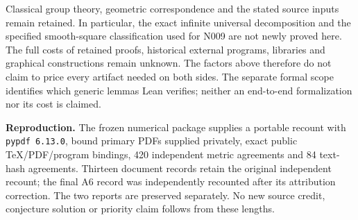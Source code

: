\documentclass[11pt,a4paper]{article}
\begin{document}
Classical group theory, geometric correspondence and the stated source
inputs remain retained. In particular, the exact infinite universal
decomposition and the specified smooth-square classification used for
N009 are not newly proved here. The full costs of retained proofs,
historical external programs, libraries and graphical constructions remain
unknown. The factors above therefore do not claim to price every artifact
needed on both sides. The separate formal scope identifies which generic
lemmas Lean verifies; neither an end-to-end formalization nor its cost is
claimed.

\medskip\noindent\textbf{Reproduction.}
The frozen numerical package supplies a portable recount with
\texttt{pypdf 6.13.0}, bound primary PDFs supplied privately, exact public
TeX/PDF/program bindings, 420 independent metric agreements and 84 text-hash
agreements. Thirteen document records retain the original independent
recount; the final A6 record was independently recounted after its
attribution correction. The two reports are preserved separately. No new
source credit, conjecture solution or priority claim follows from these
lengths.
\end{document}
